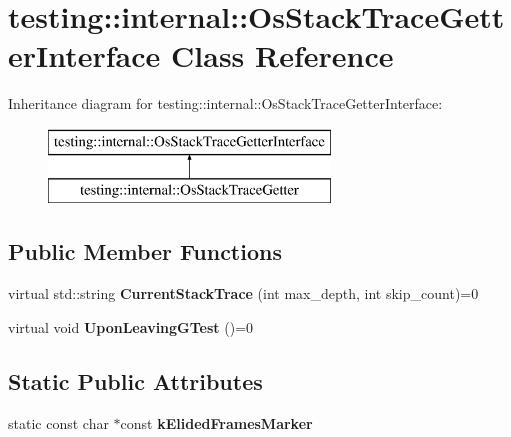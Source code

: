 \hypertarget{classtesting_1_1internal_1_1OsStackTraceGetterInterface}{}\section{testing\+:\+:internal\+:\+:Os\+Stack\+Trace\+Getter\+Interface Class Reference}
\label{classtesting_1_1internal_1_1OsStackTraceGetterInterface}
Inheritance diagram for testing\+:\+:internal\+:\+:Os\+Stack\+Trace\+Getter\+Interface\+:\begin{figure}[H]
\begin{center}
\leavevmode
\includegraphics[height=2.000000cm]{classtesting_1_1internal_1_1OsStackTraceGetterInterface}
\end{center}
\end{figure}
\subsection*{Public Member Functions}
\begin{DoxyCompactItemize}
\item 
\mbox{\label{classtesting_1_1internal_1_1OsStackTraceGetterInterface_a0c41724e4e47647a7fe2ace8e70c0ec7}} 
virtual std\+::string {\bfseries Current\+Stack\+Trace} (int max\+\_\+depth, int skip\+\_\+count)=0
\item 
\mbox{\label{classtesting_1_1internal_1_1OsStackTraceGetterInterface_a791bd120428b5a53d5eeba1b27296a39}} 
virtual void {\bfseries Upon\+Leaving\+G\+Test} ()=0
\end{DoxyCompactItemize}
\subsection*{Static Public Attributes}
\begin{DoxyCompactItemize}
\item 
static const char $\ast$const {\bfseries k\+Elided\+Frames\+Marker}
\end{DoxyCompactItemize}



